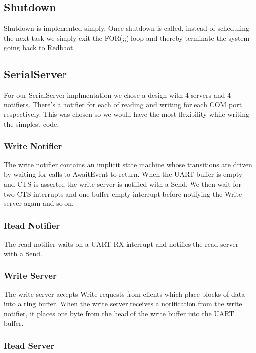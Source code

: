 \documentclass{article}
\begin{document}
\subsection{Shutdown}

Shutdown is implemented simply. Once shutdown is called, instead of scheduling the next task we simply exit the FOR(;;) loop and thereby terminate the system going back to Redboot.

\subsection{SerialServer}

For our SerialServer implmentation we chose a design with 4 servers and 4 notifiers. There's a notifier for each of reading and writing for each COM port respectively. This was chosen so we would have the most flexibility while writing the simplest code.

\subsubsection{Write Notifier}

The write notifier contains an implicit state machine whose transitions are driven by waiting for calls to AwaitEvent to return. When the UART buffer is empty and CTS is asserted the write server is notified with a Send. We then wait for two CTS interrupts and one buffer empty interrupt before notifying the Write server again and so on.

\subsubsection{Read Notifier}

The read notifier waits on a UART RX interrupt and notifies the read server with a Send.

\subsubsection{Write Server}

The write server accepts Write requests from clients which place blocks of data into a ring buffer. When the write server receives a notification from the write notifier, it places one byte from the head of the write buffer into the UART buffer.

\subsubsection{Read Server}
\end{document}
